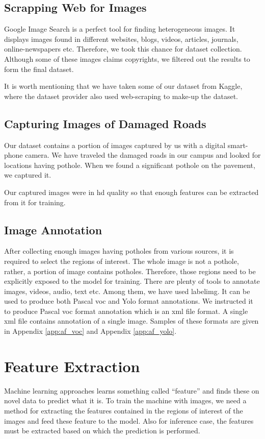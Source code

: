         \subsection{Scrapping Web for Images}
            Google Image Search is a perfect tool for finding heterogeneous images. It displays images found in different websites, blogs, videos, articles, journals, online-newspapers etc. Therefore, we took this chance for dataset collection. Although some of these images claims copyrights, we filtered out the results to form the final dataset.
            
            It is worth mentioning that we have taken some of our dataset from Kaggle, where the dataset provider also used web-scraping to make-up the dataset.
            
        \subsection{Capturing Images of Damaged Roads}
            Our dataset contains a portion of images captured by us with a digital smart-phone camera. We have traveled the damaged roads in our campus and looked for locations having pothole. When we found a significant pothole on the pavement, we captured it.
            
            Our captured images were in \acrshort{hd} quality so that enough features can be extracted from it for training.
            
        \subsection{Image Annotation}
            After collecting enough images having potholes from various sources, it is required to select the regions of interest. The whole image is not a pothole, rather, a portion of image contains potholes. Therefore, those regions need to be explicitly exposed to the model for training. There are plenty of tools to annotate images, videos, audio, text etc. Among them, we have used \gls{labelimg}. It can be used to produce both Pascal \acrfull{voc} and Yolo format annotations. We instructed it to produce Pascal \acrshort{voc} format annotation which is an \acrshort{xml} file format. A single \acrshort{xml} file contains annotation of a single image. Samples of these formats are given in Appendix \ref{app:af_voc} and Appendix \ref{app:af_yolo}.
            
    \section{Feature Extraction}
        Machine learning approaches learns something called ``feature'' and finds these on novel data to predict what it is. To train the machine with images, we need a method for extracting the features contained in the regions of interest of the images and feed these feature to the model. Also for inference case, the features must be extracted based on which the prediction is performed.
        
